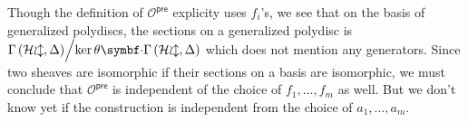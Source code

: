 \begin{remark} Though the definition of $\mathcal{O}^{\mathsf{pre}}$ explicity uses $f_{i}$'s, we see that on the basis of generalized polydiscs, the sections on a generalized polydisc is $\quotient{\sections{\mathcal{Hol}}{\Delta}}{\ker\theta\smul\sections{\mathcal{Hol}}{\Delta}}$ which does not mention any generators. Since two sheaves are isomorphic if their sections on a basis are isomorphic, we must conclude that $\mathcal{O}^{\mathsf{pre}}$ is independent of the choice of $f_{1},\dots,f_{m}$ as well. But we don't know yet if the construction is independent from the choice of $a_{1},\dots, a_{m}$.
\end{remark}

